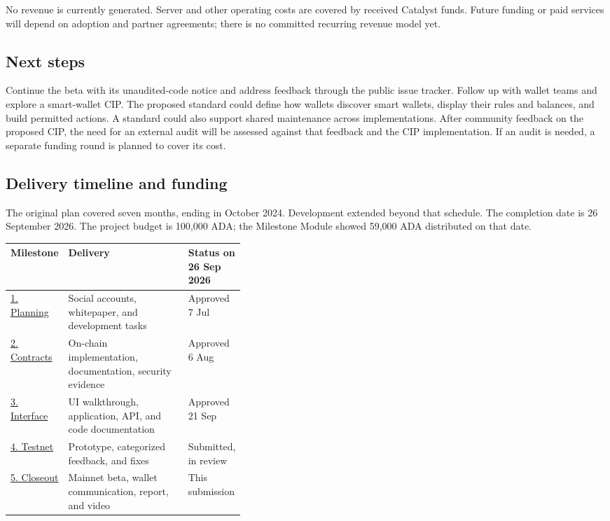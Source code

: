 \documentclass[fontsize=10pt,paper=a4,DIV=16,parskip=half-]{scrartcl}
\newcommand{\hd}[1]{{\sffamily\bfseries\color{brandnavy}#1}}
\begin{document}
No revenue is currently generated. Server and other operating costs are covered by received Catalyst funds. Future funding or paid services will depend on adoption and partner agreements; there is no committed recurring revenue model yet.

\subsection*{Next steps}
Continue the beta with its unaudited-code notice and address feedback through the public issue tracker. Follow up with wallet teams and explore a smart-wallet CIP. The proposed standard could define how wallets discover smart wallets, display their rules and balances, and build permitted actions. A standard could also support shared maintenance across implementations. After community feedback on the proposed CIP, the need for an external audit will be assessed against that feedback and the CIP implementation. If an audit is needed, a separate funding round is planned to cover its cost.

\subsection*{Delivery timeline and funding}
The original plan covered seven months, ending in October 2024. Development extended beyond that schedule. The completion date is 26 September 2026. The project budget is 100,000 ADA; the Milestone Module showed 59,000 ADA distributed on that date.

\begin{tabularx}{\linewidth}{@{}p{0.19\linewidth}X p{0.2\linewidth}@{}}
\toprule
\hd{Milestone} & \hd{Delivery} & \hd{Status on 26 Sep 2026} \\
\midrule
\href{https://milestones.projectcatalyst.io/projects/1100002/milestones/1}{1. Planning} & Social accounts, whitepaper, and development tasks & Approved 7 Jul \\
\href{https://milestones.projectcatalyst.io/projects/1100002/milestones/2}{2. Contracts} & On-chain implementation, documentation, security evidence & Approved 6 Aug \\
\href{https://milestones.projectcatalyst.io/projects/1100002/milestones/3}{3. Interface} & UI walkthrough, application, API, and code documentation & Approved 21 Sep \\
\href{https://milestones.projectcatalyst.io/projects/1100002/milestones/4}{4. Testnet} & Prototype, categorized feedback, and fixes & Submitted, in review \\
\href{https://milestones.projectcatalyst.io/projects/1100002/milestones/5}{5. Closeout} & Mainnet beta, wallet communication, report, and video & This submission \\
\bottomrule
\end{tabularx}
\end{document}

